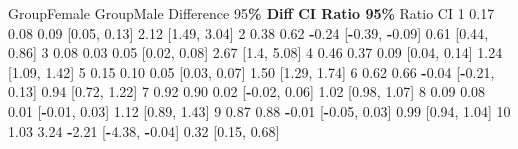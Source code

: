 \documentclass[10pt,a4paper,onecolumn]{article}
\newenvironment{Shaded}{\begin{snugshade}}{\end{snugshade}}
\newcommand{\DecValTok}[1]{\textcolor[rgb]{0.00,0.00,0.81}{#1}}
\newcommand{\FloatTok}[1]{\textcolor[rgb]{0.00,0.00,0.81}{#1}}
\newcommand{\NormalTok}[1]{#1}
\newcommand{\SpecialCharTok}[1]{\textcolor[rgb]{0.81,0.36,0.00}{\textbf{#1}}}
\begin{document}
\begin{Shaded}
\begin{Highlighting}[]
\NormalTok{   GroupFemale GroupMale Difference    }\DecValTok{95}\SpecialCharTok{\% Diff CI Ratio 95\%}\NormalTok{ Ratio CI}
\DecValTok{1}         \FloatTok{0.17}      \FloatTok{0.08}       \FloatTok{0.09}\NormalTok{   [}\FloatTok{0.05}\NormalTok{, }\FloatTok{0.13}\NormalTok{]  }\FloatTok{2.12}\NormalTok{ [}\FloatTok{1.49}\NormalTok{, }\FloatTok{3.04}\NormalTok{]}
\DecValTok{2}         \FloatTok{0.38}      \FloatTok{0.62}      \SpecialCharTok{{-}}\FloatTok{0.24}\NormalTok{ [}\SpecialCharTok{{-}}\FloatTok{0.39}\NormalTok{, }\SpecialCharTok{{-}}\FloatTok{0.09}\NormalTok{]  }\FloatTok{0.61}\NormalTok{ [}\FloatTok{0.44}\NormalTok{, }\FloatTok{0.86}\NormalTok{]}
\DecValTok{3}         \FloatTok{0.08}      \FloatTok{0.03}       \FloatTok{0.05}\NormalTok{   [}\FloatTok{0.02}\NormalTok{, }\FloatTok{0.08}\NormalTok{]  }\FloatTok{2.67}\NormalTok{  [}\FloatTok{1.4}\NormalTok{, }\FloatTok{5.08}\NormalTok{]}
\DecValTok{4}         \FloatTok{0.46}      \FloatTok{0.37}       \FloatTok{0.09}\NormalTok{   [}\FloatTok{0.04}\NormalTok{, }\FloatTok{0.14}\NormalTok{]  }\FloatTok{1.24}\NormalTok{ [}\FloatTok{1.09}\NormalTok{, }\FloatTok{1.42}\NormalTok{]}
\DecValTok{5}         \FloatTok{0.15}      \FloatTok{0.10}       \FloatTok{0.05}\NormalTok{   [}\FloatTok{0.03}\NormalTok{, }\FloatTok{0.07}\NormalTok{]  }\FloatTok{1.50}\NormalTok{ [}\FloatTok{1.29}\NormalTok{, }\FloatTok{1.74}\NormalTok{]}
\DecValTok{6}         \FloatTok{0.62}      \FloatTok{0.66}      \SpecialCharTok{{-}}\FloatTok{0.04}\NormalTok{  [}\SpecialCharTok{{-}}\FloatTok{0.21}\NormalTok{, }\FloatTok{0.13}\NormalTok{]  }\FloatTok{0.94}\NormalTok{ [}\FloatTok{0.72}\NormalTok{, }\FloatTok{1.22}\NormalTok{]}
\DecValTok{7}         \FloatTok{0.92}      \FloatTok{0.90}       \FloatTok{0.02}\NormalTok{  [}\SpecialCharTok{{-}}\FloatTok{0.02}\NormalTok{, }\FloatTok{0.06}\NormalTok{]  }\FloatTok{1.02}\NormalTok{ [}\FloatTok{0.98}\NormalTok{, }\FloatTok{1.07}\NormalTok{]}
\DecValTok{8}         \FloatTok{0.09}      \FloatTok{0.08}       \FloatTok{0.01}\NormalTok{  [}\SpecialCharTok{{-}}\FloatTok{0.01}\NormalTok{, }\FloatTok{0.03}\NormalTok{]  }\FloatTok{1.12}\NormalTok{ [}\FloatTok{0.89}\NormalTok{, }\FloatTok{1.43}\NormalTok{]}
\DecValTok{9}         \FloatTok{0.87}      \FloatTok{0.88}      \SpecialCharTok{{-}}\FloatTok{0.01}\NormalTok{  [}\SpecialCharTok{{-}}\FloatTok{0.05}\NormalTok{, }\FloatTok{0.03}\NormalTok{]  }\FloatTok{0.99}\NormalTok{ [}\FloatTok{0.94}\NormalTok{, }\FloatTok{1.04}\NormalTok{]}
\DecValTok{10}        \FloatTok{1.03}      \FloatTok{3.24}      \SpecialCharTok{{-}}\FloatTok{2.21}\NormalTok{ [}\SpecialCharTok{{-}}\FloatTok{4.38}\NormalTok{, }\SpecialCharTok{{-}}\FloatTok{0.04}\NormalTok{]  }\FloatTok{0.32}\NormalTok{ [}\FloatTok{0.15}\NormalTok{, }\FloatTok{0.68}\NormalTok{]}
\end{Highlighting}
\end{Shaded}
\end{document}
